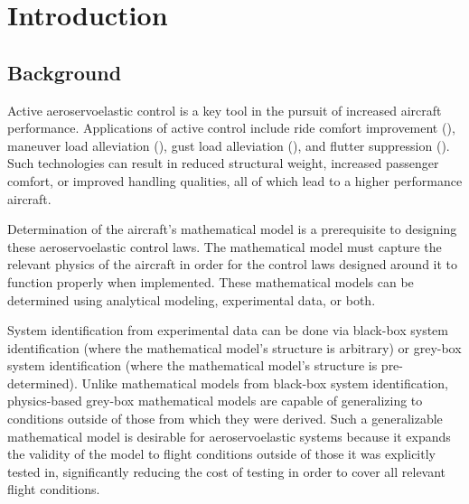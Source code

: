 \chapter{Introduction}
\label{ch:introduction}

%
%
%
%
%
%

\section{Background}

Active aeroservoelastic control is a key tool in the pursuit of increased aircraft performance. Applications of active control include ride comfort improvement (\cite{Jones1979}), maneuver load alleviation (\cite{Sensburg1982}), gust load alleviation (\cite{Nissim1976}), and flutter suppression (\cite{Livne2018}). Such technologies can result in reduced structural weight, increased passenger comfort, or improved handling qualities, all of which lead to a higher performance aircraft.

Determination of the aircraft's mathematical model is a prerequisite to designing these aeroservoelastic control laws. The mathematical model must capture the relevant physics of the aircraft in order for the control laws designed around it to function properly when implemented. These mathematical models can be determined using analytical modeling, experimental data, or both.

System identification from experimental data can be done via black-box system identification (where the mathematical model's structure is arbitrary) or grey-box system identification (where the mathematical model's structure is pre-determined). Unlike mathematical models from black-box system identification, physics-based grey-box mathematical models are capable of generalizing to conditions outside of those from which they were derived. Such a generalizable mathematical model is desirable for aeroservoelastic systems because it expands the validity of the model to flight conditions outside of those it was explicitly tested in, significantly reducing the cost of testing in order to cover all relevant flight conditions.

